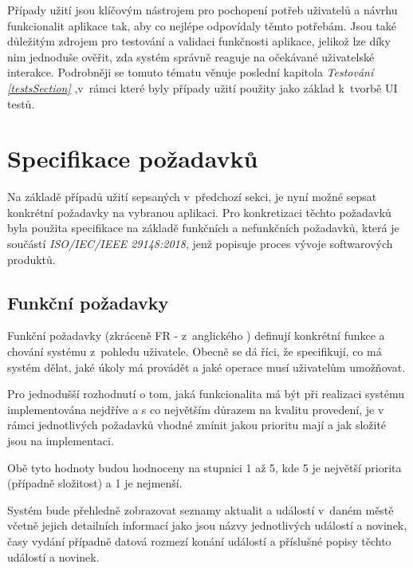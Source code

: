 \bigskip

Případy užití jsou klíčovým nástrojem pro pochopení potřeb uživatelů a návrhu funkcionalit aplikace tak, aby co nejlépe odpovídaly těmto potřebám. 
Jsou také důležitým zdrojem pro testování a validaci funkčnosti aplikace, jelikož lze díky nim jednoduše ověřit, zda systém správně reaguje na očekávané 
uživatelské interakce. Podrobněji se tomuto tématu věnuje poslední kapitola \textit{Testování \ref{testsSection}} ,v~rámci které byly případy užití
použity jako základ k~tvorbě UI testů.



\section{Specifikace požadavků}
Na základě případů užití sepsaných v~předchozí sekci, je nyní možné sepsat konkrétní požadavky na vybranou aplikaci.
Pro konkretizaci těchto požadavků byla použita specifikace na základě funkčních a nefunkčních požadavků, která je součástí \textit{ISO/IEC/IEEE 29148:2018}\cite{iso},
jenž popisuje proces vývoje softwarových produktů.

\subsection{Funkční požadavky}
Funkční požadavky (zkráceně FR - z~anglického ) definují konkrétní funkce a chování systému z~pohledu uživatele. 
Obecně se dá říci, že specifikují, co má systém dělat, jaké úkoly má provádět a jaké operace musí uživatelům umožňovat. \cite{functionalReq}

Pro jednodušší rozhodnutí o tom, jaká funkcionalita má být při realizaci systému implementována nejdříve a s co největším důrazem
 na kvalitu provedení, je v rámci jednotlivých požadavků vhodné zmínit jakou prioritu mají a jak složité jsou na implementaci.

Obě tyto hodnoty budou hodnoceny na stupnici 1 až 5, kde 5 je největší priorita (případně složitost) a 1 je nejmenší.




Systém bude přehledně zobrazovat seznamy aktualit a událostí v~daném městě včetně jejich detailních informací jako jsou názvy jednotlivých
událostí a novinek, časy vydání případně datová rozmezí konání událostí a příslušné popisy těchto událostí a novinek.

